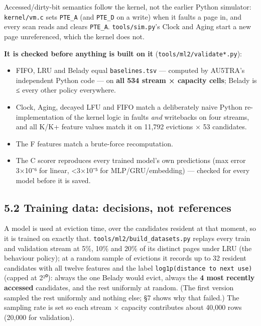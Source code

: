 \documentclass[10pt,a4paper]{article}
\newcommand{\code}[1]{\texttt{#1}}
\begin{document}
Accessed/dirty-bit semantics follow the kernel, not the earlier Python simulator: \code{kernel/\allowbreak{}vm.\allowbreak{}c} sets \code{PTE\_\allowbreak{}A} (and \code{PTE\_\allowbreak{}D} on a write) when it faults a page in, and every scan reads and clears \code{PTE\_\allowbreak{}A}. \code{tools/\allowbreak{}sim.\allowbreak{}py}'s Clock and Aging start a new page unreferenced, which the kernel does not.

\textbf{It is checked before anything is built on it} (\code{tools/\allowbreak{}ml2/\allowbreak{}validate*.\allowbreak{}py}):

\begin{itemize}
\item FIFO, LRU and Belady equal \code{baselines.\allowbreak{}tsv} — computed by AU5TRA's independent Python code — on \textbf{all 534 stream × capacity cells}; Belady is ≤ every other policy everywhere.
\item Clock, Aging, decayed LFU and FIFO match a deliberately naive Python re-implementation of the kernel logic in faults \emph{and} writebacks on four streams, and all K/K+ feature values match it on 11,792 evictions × 53 candidates.
\item The F features match a brute-force recomputation.
\item The C scorer reproduces every trained model's own predictions (max error 3×10⁻⁶ for linear, <3×10⁻⁵ for MLP/GRU/embedding) — checked for every model before it is saved.
\end{itemize}

\subsection*{5.2 Training data: decisions, not references}

A model is used at eviction time, over the candidates resident at that moment, so it is trained on exactly that. \code{tools/\allowbreak{}ml2/\allowbreak{}build\_\allowbreak{}datasets.\allowbreak{}py} replays every train and validation stream at 5\%, 10\% and 20\% of its distinct pages under LRU (the behaviour policy); at a random sample of evictions it records up to 32 resident candidates with all twelve features and the label \code{log1p(distance to next use)} (capped at 2²⁰): always the one Belady would evict, always the \textbf{4 most recently accessed} candidates, and the rest uniformly at random. (The first version sampled the rest uniformly and nothing else; §7 shows why that failed.) The sampling rate is set so each stream × capacity contributes about 40,000 rows (20,000 for validation).
\end{document}
